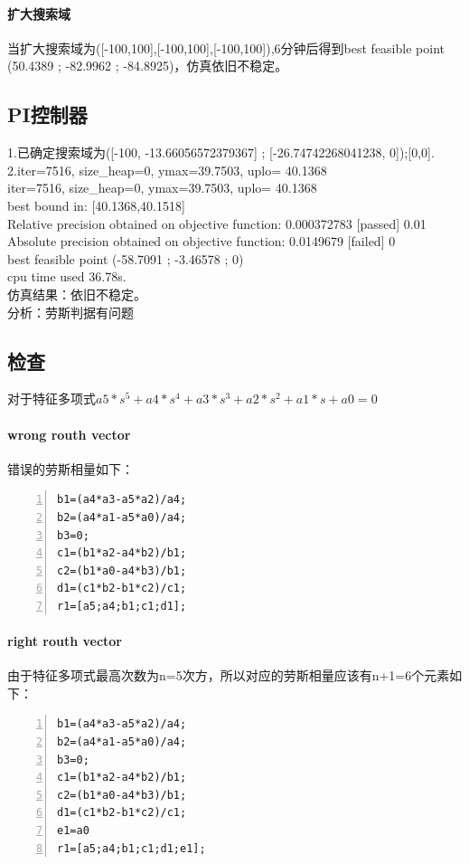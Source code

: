 \documentclass[UTF8,a4paper]{ctexart}
\begin{document}
 \paragraph{扩大搜索域}
 当扩大搜索域为([-100,100],[-100,100],[-100,100]),6分钟后得到best feasible point (50.4389 ; -82.9962 ; -84.8925)，仿真依旧不稳定。
 \subsection{PI控制器}
 1.已确定搜索域为([-100, -13.66056572379367] ; [-26.74742268041238, 0]);[0,0].\\
 2.iter=7516,  size_heap=0,  ymax=39.7503,  uplo= 40.1368\\
iter=7516,  size_heap=0,  ymax=39.7503,  uplo= 40.1368\\
 best bound in: [40.1368,40.1518]\\
 Relative precision obtained on objective function: 0.000372783  [passed]  0.01\\
 Absolute precision obtained on objective function: 0.0149679  [failed]  0\\
 best feasible point (-58.7091 ; -3.46578 ; 0)\\
 cpu time used 36.78s.\\
 仿真结果：依旧不稳定。\\
 分析：劳斯判据有问题\\
 \subsection{检查}
 对于特征多项式$a5*s^5+a4*s^4+a3*s^3+a2*s^2+a1*s+a0=0$\\
  \paragraph{wrong routh vector}
  错误的劳斯相量如下：
  \begin{lstlisting}[language={[ANSI]C},numbers=left,numberstyle=\tiny]  
  b1=(a4*a3-a5*a2)/a4;
b2=(a4*a1-a5*a0)/a4;
b3=0;
c1=(b1*a2-a4*b2)/b1;
c2=(b1*a0-a4*b3)/b1;
d1=(c1*b2-b1*c2)/c1;
r1=[a5;a4;b1;c1;d1];
   \end{lstlisting}
    \paragraph{right routh vector}
  由于特征多项式最高次数为n=5次方，所以对应的劳斯相量应该有n+1=6个元素如下：
    \begin{lstlisting}[language={[ANSI]C},numbers=left,numberstyle=\tiny]  
  b1=(a4*a3-a5*a2)/a4;
b2=(a4*a1-a5*a0)/a4;
b3=0;
c1=(b1*a2-a4*b2)/b1;
c2=(b1*a0-a4*b3)/b1;
d1=(c1*b2-b1*c2)/c1;
e1=a0
r1=[a5;a4;b1;c1;d1;e1];
   \end{lstlisting}
\end{document}
